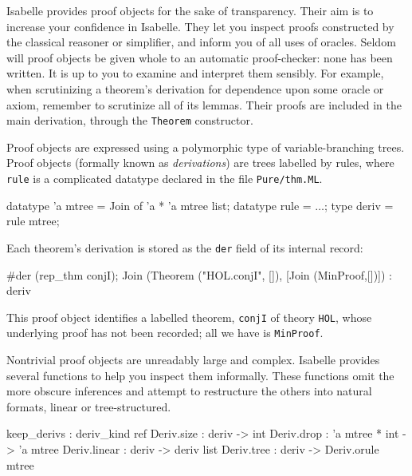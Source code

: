 Isabelle provides proof objects for the sake of transparency.  Their aim is to
increase your confidence in Isabelle.  They let you inspect proofs constructed
by the classical reasoner or simplifier, and inform you of all uses of
oracles.  Seldom will proof objects be given whole to an automatic
proof-checker: none has been written.  It is up to you to examine and
interpret them sensibly.  For example, when scrutinizing a theorem's
derivation for dependence upon some oracle or axiom, remember to scrutinize
all of its lemmas.  Their proofs are included in the main derivation, through
the {\tt Theorem} constructor.

Proof objects are expressed using a polymorphic type of variable-branching
trees.  Proof objects (formally known as {\em derivations\/}) are trees
labelled by rules, where {\tt rule} is a complicated datatype declared in the
file {\tt Pure/thm.ML}.
\begin{ttbox} 
datatype 'a mtree = Join of 'a * 'a mtree list;
datatype rule     = \(\ldots\);
type deriv        = rule mtree;
\end{ttbox}
%
Each theorem's derivation is stored as the {\tt der} field of its internal
record: 
\begin{ttbox} 
#der (rep_thm conjI);
{\out Join (Theorem ("HOL.conjI", []), [Join (MinProof,[])]) : deriv}
\end{ttbox}
This proof object identifies a labelled theorem, {\tt conjI} of theory
\texttt{HOL}, whose underlying proof has not been recorded; all we
have is {\tt MinProof}.

Nontrivial proof objects are unreadably large and complex.  Isabelle provides
several functions to help you inspect them informally.  These functions omit
the more obscure inferences and attempt to restructure the others into natural
formats, linear or tree-structured.

\begin{ttbox} 
keep_derivs  : deriv_kind ref
Deriv.size   : deriv -> int
Deriv.drop   : 'a mtree * int -> 'a mtree
Deriv.linear : deriv -> deriv list
Deriv.tree   : deriv -> Deriv.orule mtree
\end{ttbox}

